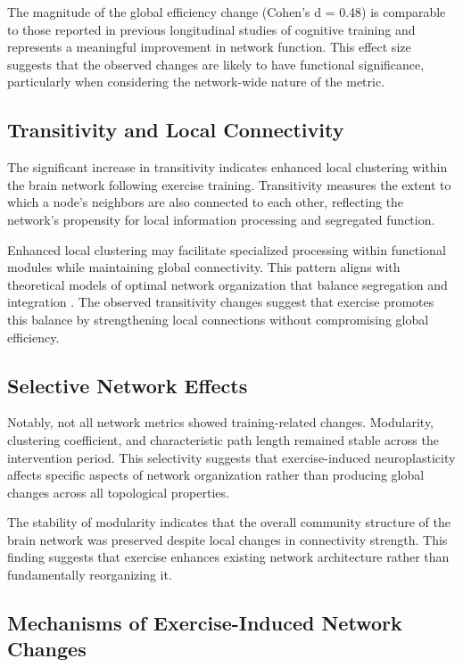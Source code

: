 \documentclass[12pt,a4paper]{article}
\begin{document}
The magnitude of the global efficiency change (Cohen's d = 0.48) is comparable to those reported in previous longitudinal studies of cognitive training and represents a meaningful improvement in network function. This effect size suggests that the observed changes are likely to have functional significance, particularly when considering the network-wide nature of the metric.

\subsection{Transitivity and Local Connectivity}

The significant increase in transitivity indicates enhanced local clustering within the brain network following exercise training. Transitivity measures the extent to which a node's neighbors are also connected to each other, reflecting the network's propensity for local information processing and segregated function.

Enhanced local clustering may facilitate specialized processing within functional modules while maintaining global connectivity. This pattern aligns with theoretical models of optimal network organization that balance segregation and integration \citep{Sporns2013}. The observed transitivity changes suggest that exercise promotes this balance by strengthening local connections without compromising global efficiency.

\subsection{Selective Network Effects}

Notably, not all network metrics showed training-related changes. Modularity, clustering coefficient, and characteristic path length remained stable across the intervention period. This selectivity suggests that exercise-induced neuroplasticity affects specific aspects of network organization rather than producing global changes across all topological properties.

The stability of modularity indicates that the overall community structure of the brain network was preserved despite local changes in connectivity strength. This finding suggests that exercise enhances existing network architecture rather than fundamentally reorganizing it.

\subsection{Mechanisms of Exercise-Induced Network Changes}
\end{document}
